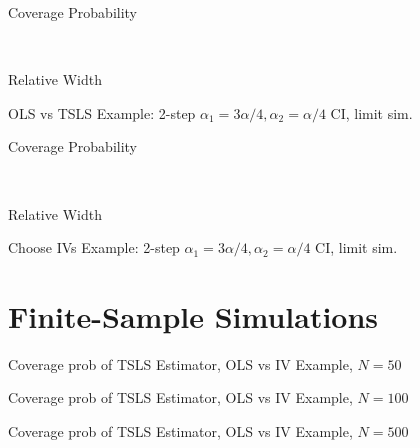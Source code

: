 \documentclass[12pt,letterpaper]{article}
\begin{document}
\begin{table}[h]
  \centering
  \begin{subtable}{0.48\textwidth}
    \caption{Coverage Probability}
    
  \end{subtable}
  ~
  \begin{subtable}{0.48\textwidth}
    \caption{Relative Width}
    
  \end{subtable}
  \label{tab:Limit2StepNarrowTauOLSvsIV}
  \caption{OLS vs TSLS Example: 2-step $\alpha_1 = 3\alpha/4,  \alpha_2 = \alpha/4$ CI, limit sim.}
\end{table}

\begin{table}[h]
  \centering
  \begin{subtable}{0.48\textwidth}
    \caption{Coverage Probability}
    
  \end{subtable}
  ~
  \begin{subtable}{0.48\textwidth}
    \caption{Relative Width}
    
  \end{subtable}
  \label{tab:Limit2StepNarrowTauChooseIVs}
  \caption{Choose IVs Example: 2-step $\alpha_1 = 3\alpha/4,  \alpha_2 = \alpha/4$ CI, limit sim.}
\end{table}



\section{Finite-Sample Simulations}


\begin{table}[h]
  \centering
  
  \label{tab:CISim50TSLS_OLSvsIV}
  \caption{Coverage prob of TSLS Estimator, OLS vs IV Example, $N=50$}
\end{table}

\begin{table}[h]
  \centering
  
  \label{tab:CISim100TSLS_OLSvsIV}
  \caption{Coverage prob of TSLS Estimator, OLS vs IV Example, $N=100$}
\end{table}

\begin{table}[h]
  \centering
  
  \label{tab:CISim500TSLS_OLSvsIV}
  \caption{Coverage prob of TSLS Estimator, OLS vs IV Example, $N=500$}
\end{table}
\end{document}
